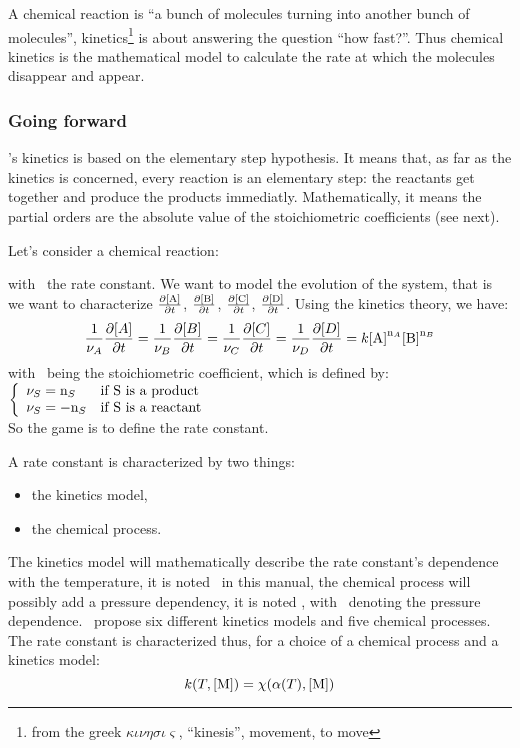 A chemical reaction is ``a bunch of molecules
turning into another bunch of molecules'', kinetics\footnote{%
from the greek $\kappa\iota\nu\eta\sigma\iota\varsigma$, ``kinesis'', movement, to move}
is about answering the question ``how fast?''.
Thus chemical kinetics is the mathematical model
to calculate the rate at which the molecules disappear and
appear.

\subsubsection{Going forward}

\antioch's kinetics is based on the elementary step
hypothesis. It means that, as far as the kinetics is
concerned, every reaction is an elementary step:
the reactants get together and produce the products
immediatly. Mathematically, it means
the partial orders are the absolute
value of the stoichiometric coefficients (see next).

Let's consider a chemical reaction:
\begin{chemicalEquation}
\label{genericX}
\end{chemicalEquation}
with \rcons\ the rate constant.
We want to model the evolution of the system, that is we want to
characterize 
$\doverdt{\conc[A]}$,
$\doverdt{\conc[B]}$,
$\doverdt{\conc[C]}$,
$\doverdt{\conc[D]}$.
Using the kinetics theory, we have:
\begin{equation}
\frac{1}{\scoef[A]}\doverdt{[A]} = 
\frac{1}{\scoef[B]}\doverdt{[B]} = 
\frac{1}{\scoef[C]}\doverdt{[C]} = 
\frac{1}{\scoef[D]}\doverdt{[D]} = 
\rcons\conc[A]^{\scoefabs[A]}\conc[B]^{\scoefabs[B]}
\end{equation}
with \scoef[A]\ being the stoichiometric coefficient, which is defined by:\\[5pt]
$\left\{\begin{array}{ll}
\scoef[S] = \scoefabs[S] & \text{if \ce{S} is a product} \\
\scoef[S] = -\scoefabs[S] & \text{if \ce{S} is a reactant} \\
\end{array}\right.$\\[5pt]
So the game is to define the rate constant. 

A rate constant is characterized by two things:
\begin{itemize}
\item the kinetics model,
\item the chemical process.
\end{itemize}
The kinetics model will mathematically describe the rate constant's dependence with
the temperature, it is noted \kinMod\ in this manual, the chemical process will
possibly add a pressure dependency, it is noted \chemProc, with \conc[M]\
denoting the pressure dependence.
\antioch\ propose six different kinetics models and five chemical processes.
The rate constant is characterized thus, for a choice of a chemical process and
a kinetics model:
\begin{equation}
\rateCons = \chemProc
\end{equation}

